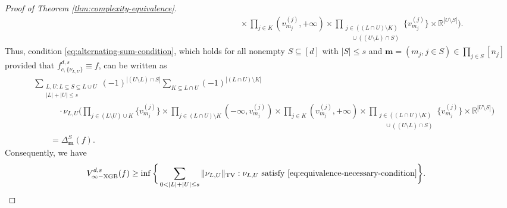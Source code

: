 \documentclass[10pt]{article}
\newcommand{\R}{{\mathbb R}}
\newcommand{\vinfxgb}{{V^{d, s}_{\infty-\text{XGB}}}}
\newcommand{\fcnu}{{f^{d, s}_{c, \{\nu_{L, U}\}}}}
\newcommand{\mbf}{{\mathbf{m}}}
\begin{document}
\begin{proof}[Proof of Theorem \ref{thm:complexity-equivalence}]
\begin{equation*}
\begin{aligned}
    &\qquad \qquad \qquad \qquad \qquad \qquad \qquad \qquad \qquad 
    \qquad \quad
    \times \prod_{j \in K} (v^{(j)}_{m_j}, +\infty) \times 
    \prod_{\substack{j \in ((L \cap U) \setminus K) \\
    \quad \cup ((U \setminus L) \cap S)}} 
    \{v^{(j)}_{m_j}\} \times \R^{|U \setminus S|}\Big).
\end{aligned}
\end{equation*}
Thus, condition \eqref{eq:alternating-sum-condition}, which holds for 
all nonempty $S \subseteq [d]$ with $|S| \le s$ and
$\mbf = (m_j, j \in S) \in \prod_{j \in S} [n_j]$ 
provided that $\fcnu \equiv f$, can be written as
\begin{align}\label{eq:equivalence-necessary-condition}
    &\sum_{\substack{L, U: L \subseteq S \subseteq L \cup U 
    \\ |L| + |U| \le s}} (-1)^{|(U \setminus L) \cap S|} 
    \sum_{K \subseteq L \cap U} (-1)^{|(L \cap U) \setminus K|} 
    \nonumber \\
    &\qquad \quad \cdot \nu_{L, U} \Big(\prod_{j \in (L \setminus U) \cup K} 
    \{v^{(j)}_{m_j}\} \times \prod_{j \in (L \cap U) \setminus K} 
    (-\infty, v^{(j)}_{m_j})
    \times \prod_{j \in K} (v^{(j)}_{m_j}, +\infty) \times
    \prod_{\substack{j \in ((L \cap U) \setminus K) \\
    \quad \cup ((U \setminus L) \cap S)}} 
    \{v^{(j)}_{m_j}\} \times \R^{|U \setminus S|}\Big) \nonumber \\
    &\qquad = \Delta^S_{\mbf}(f).
\end{align}
Consequently, we have
\begin{align}\label{eq:reduction-based-on-alt-sums}
    \vinfxgb(f) &\ge \inf \bigg\{
    \sum_{0 < |L| + |U| \le s} \|\nu_{L, U}\|_{\text{TV}}: 
    \nu_{L, U} 
    \text{ satisfy \eqref{eq:equivalence-necessary-condition}}\bigg\}.
\end{align}
    

\end{proof}
\end{document}
